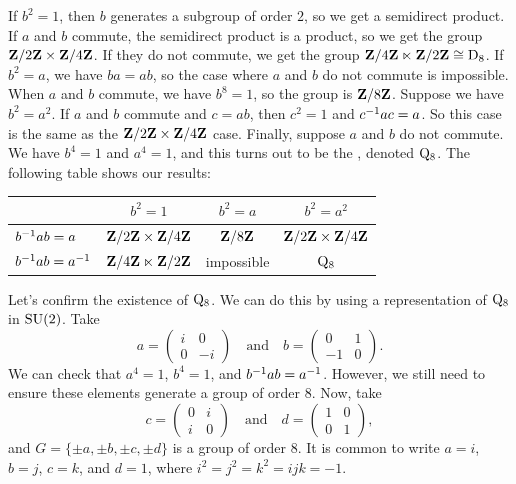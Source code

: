 \documentclass[11pt, oneside]{amsart}
\begin{document}
If $b^2=1$, then $b$ generates a subgroup of order $2$, so we get a semidirect product. If $a$ and $b$ commute, the semidirect product is a product, so we get the group $\mathbf Z / 2\mathbf Z \times \mathbf Z / 4\mathbf Z$. If they do not commute, we get the group $\mathbf Z / 4\mathbf Z \ltimes \mathbf Z / 2\mathbf Z\cong \operatorname{D}_8$. If $b^2=a$, we have $ba = ab$, so the case where $a$ and $b$ do not commute is impossible. When $a$ and $b$ commute, we have $b^8 = 1$, so the group is $\mathbf Z/8\mathbf Z$. Suppose we have $b^2 = a^2$. If $a$ and $b$ commute and $c=ab$, then $c^2 = 1$ and $c^{-1} ac = a$. So this case is the same as the $\mathbf Z / 2\mathbf Z \times \mathbf Z / 4\mathbf Z$ case. Finally, suppose $a$ and $b$ do not commute. We have $b^4= 1$ and $a^4 =1$, and this turns out to be the , denoted $\operatorname{Q_8}$. The following table shows our results:
\begin{center}
\begin{tabular}{lccc} 
&$b^2=1$ &$ b^2 = a$ & $b^2 = a^2$\\
\midrule
$b^{-1} ab=a $\ &$\mathbf Z / 2\mathbf Z \times \mathbf Z / 4\mathbf Z$ &$\mathbf Z/8\mathbf Z$& $\mathbf Z / 2\mathbf Z \times \mathbf Z / 4\mathbf Z$\\
$b^{-1} a b = a^{-1}$\hspace*{10pt} &$\mathbf Z / 4\mathbf Z \ltimes \mathbf Z / 2\mathbf Z$& \textrm{impossible}& $\operatorname{Q_8}$\\
\end{tabular}
\end{center}

Let's confirm the existence of $\operatorname{Q_8}$. We can do this by using a representation of $\operatorname{Q_8}$ in $\operatorname{SU}(2)$. Take
$$
a = \left ( \begin{array} {cc} i & 0 \\0& -i\end{array}\right) \quad \textrm{and} \quad b = \left ( \begin{array} {cc} 0 & 1\\-1& 0\end{array}\right).
$$
We can check that $a^4 =1$, $b^4 = 1$, and $b^{-1} a b = a^{-1}$. However, we still need to ensure these elements generate a group of order $8$. Now, take 
$$
c = \left ( \begin{array} {cc} 0& i \\i& 0\end{array}\right) \quad \textrm{and} \quad d= \left ( \begin{array} {cc} 1 & 0\\0& 1\end{array}\right),
$$
and $G = \{\pm a,\pm b,\pm c,\pm d\}$ is a group of order $8$. It is common to write $a=i$, $b = j$, $c=k$, and $d=1$, where $i^2 =j^2 =k^2 = ijk = -1$.
\end{document}
